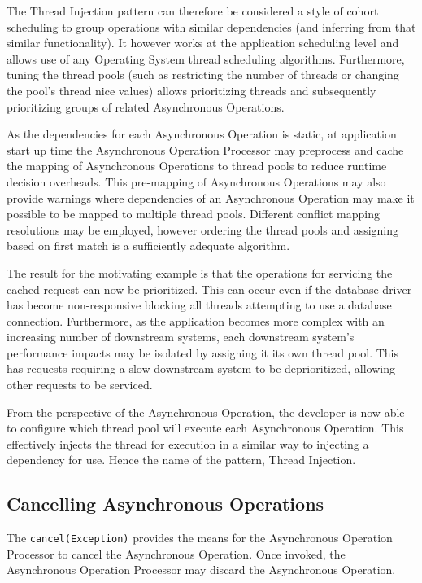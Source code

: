 \documentclass[prodmode]{style/acmlarge}
\begin{document}
The Thread Injection pattern can therefore be considered a style of cohort
scheduling \cite{cohort} to group operations with similar dependencies (and
inferring from that similar functionality).  It however works at the application
scheduling level and allows use of any Operating System thread scheduling
algorithms.  Furthermore, tuning the thread pools (such as restricting the
number of threads or changing the pool's thread nice values) allows prioritizing
threads and subsequently prioritizing groups of related Asynchronous Operations.

As the dependencies for each Asynchronous Operation is static, at application
start up time the Asynchronous Operation Processor may preprocess and cache the
mapping of Asynchronous Operations to thread pools to reduce runtime decision
overheads.  This pre-mapping of Asynchronous Operations may also provide
warnings where dependencies of an Asynchronous Operation may make it possible to
be mapped to multiple thread pools.  Different conflict mapping resolutions may
be employed, however ordering the thread pools and assigning based on first
match is a sufficiently adequate algorithm.

The result for the motivating example is that the operations for servicing the
cached request can now be prioritized.  This can occur even if the database
driver has become non-responsive blocking all threads attempting to use a
database connection.  Furthermore, as the application becomes more complex with
an increasing number of downstream systems, each downstream system's performance
impacts may be isolated by assigning it its own thread pool.  This has requests
requiring a slow downstream system to be deprioritized, allowing other requests
to be serviced.

From the perspective of the Asynchronous Operation, the developer is now able to
configure which thread pool will execute each Asynchronous Operation.  This
effectively injects the thread for execution in a similar way to injecting a
dependency for use.  Hence the name of the pattern, Thread Injection.


\subsection{Cancelling Asynchronous Operations}

The \texttt{cancel(Exception)} provides the means for the Asynchronous Operation
Processor to cancel the Asynchronous Operation.  Once invoked, the Asynchronous
Operation Processor may discard the Asynchronous Operation.
\end{document}
